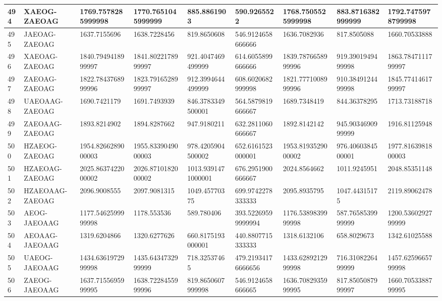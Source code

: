 {\begin{longtable}{|l|l|l|l|l|l|l|l|l|}
        494 & XAEOG-ZAEOAG & 1769.7578285999998 & 1770.7651045999999 & 885.8861903 & 590.9265522 & 1768.7505525999998 & 883.8716382999999 & 1792.7475978799998 \\ \hline
        495 & JAEOAG-ZAEOAG & 1637.7155696 & 1638.7228456 & 819.8650608 & 546.9124658666666 & 1636.7082936 & 817.8505088 & 1660.70533888 \\ \hline
        496 & XAEOAG-ZAEOAG & 1840.7949418999997 & 1841.8022178999997 & 921.4047469499999 & 614.6055899666666 & 1839.7876658999996 & 919.3901949499998 & 1863.7847111799997 \\ \hline
        497 & ZAEOAG-ZAEOAG & 1822.7843768999996 & 1823.7916528999997 & 912.3994644499999 & 608.6020682999998 & 1821.7771008999996 & 910.3849124499998 & 1845.7741461799997 \\ \hline
        498 & UAEOAAG-ZAEOAG & 1690.7421179 & 1691.7493939 & 846.3783349500001 & 564.5879819666667 & 1689.7348419 & 844.36378295 & 1713.73188718 \\ \hline
        499 & ZAEOAAG-ZAEOAG & 1893.8214902 & 1894.8287662 & 947.9180211 & 632.2811060666667 & 1892.8142142 & 945.9034690999999 & 1916.81125948 \\ \hline
        500 & HZAEOG-ZAEOAG & 1954.8266289000003 & 1955.8339049000003 & 978.4205904500002 & 652.6161523000001 & 1953.8193529000002 & 976.4060384500001 & 1977.8163981800003 \\ \hline
        501 & HZAEOAG-ZAEOAG & 2025.8637422000002 & 2026.8710182000002 & 1013.9391471000001 & 676.2951900666667 & 2024.8564662 & 1011.9245951 & 2048.85351148 \\ \hline
        502 & HZAEOAAG-ZAEOAG & 2096.9008555 & 2097.9081315 & 1049.45770375 & 699.9742278333333 & 2095.8935795 & 1047.44315175 & 2119.89062478 \\ \hline
        503 & AEOG-JAEOAAG & 1177.5462599999998 & 1178.553536 & 589.780406 & 393.52269599999994 & 1176.5389839999998 & 587.7658539999999 & 1200.5360292799999 \\ \hline
        504 & AEOAAG-JAEOAAG & 1319.6204866 & 1320.6277626 & 660.8175193000001 & 440.8807715333333 & 1318.6132106 & 658.8029673 & 1342.61025588 \\ \hline
        505 & UAEOG-JAEOAAG & 1434.6361972999998 & 1435.6434732999999 & 718.32537465 & 479.21934176666656 & 1433.6289212999998 & 716.3108226499999 & 1457.6259665799998 \\ \hline
        506 & ZAEOG-JAEOAAG & 1637.7155695999995 & 1638.7228455999996 & 819.8650607999998 & 546.9124658666665 & 1636.7082935999995 & 817.8505087999997 & 1660.7053388799995 \\ \hline

\end{longtable}}
